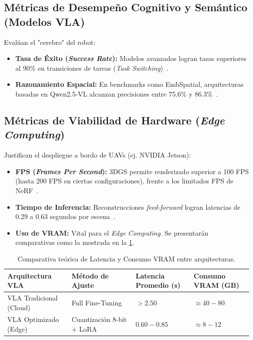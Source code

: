 \documentclass[12pt,a4paper]{article}
\begin{document}
	\subsection{Métricas de Desempeño Cognitivo y Semántico (Modelos VLA)}
	Evalúan el "cerebro" del robot:
	\begin{itemize}
		\item \textbf{Tasa de Éxito (\textit{Success Rate}):} Modelos avanzados logran tasas superiores al 90\% en transiciones de tareas (\textit{Task Switching})~\cite{li2025switchvla}.
		\item \textbf{Razonamiento Espacial:} En benchmarks como EmbSpatial, arquitecturas basadas en Qwen2.5-VL alcanzan precisiones entre 75.6\% y 86.3\%~\cite{bai2025qwen3vl, astribot2025lumo}.
	\end{itemize}
	
	\subsection{Métricas de Viabilidad de Hardware (\textit{Edge Computing})}
	Justifican el despliegue a bordo de UAVs (ej. NVIDIA Jetson):
	\begin{itemize}
		\item \textbf{FPS (\textit{Frames Per Second}):} 3DGS permite renderizado superior a 100 FPS (hasta 200 FPS en ciertas configuraciones), frente a los limitados FPS de NeRF~\cite{li2025drivingforward}.
		\item \textbf{Tiempo de Inferencia:} Reconstrucciones \textit{feed-forward} logran latencias de 0.29 a 0.63 segundos por escena~\cite{li2025drivingforward}.
		\item \textbf{Uso de VRAM:} Vital para el \textit{Edge Computing}. Se presentarán comparativas como la mostrada en la \cref{tab:comparativa_vram}.
	\end{itemize}
	
	\begin{table}[htbp]
		\centering
		\caption{Comparativa teórica de Latencia y Consumo VRAM entre arquitecturas.}
		\label{tab:comparativa_vram}
		\begin{tabularx}{\textwidth}{l >{\centering\arraybackslash}X >{\centering\arraybackslash}X >{\centering\arraybackslash}X}
			\toprule
			\textbf{Arquitectura VLA} & \textbf{Método de Ajuste} & \textbf{Latencia Promedio (s)} & \textbf{Consumo VRAM (GB)} \\
			\midrule
			VLA Tradicional (Cloud) & Full Fine-Tuning & $> 2.50$ & $\approx 40 - 80$ \\ \addlinespace
			VLA Optimizado (Edge) & Cuantización 8-bit + LoRA & $0.60 - 0.85$ & $\approx 8 - 12$ \\
			\bottomrule
		\end{tabularx}
	\end{table}
	
\end{document}

